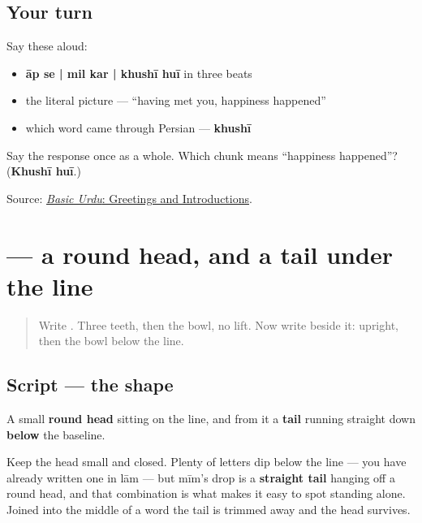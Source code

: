 \subsection*{Your turn}
Say these aloud:

\begin{itemize}
\raggedright
  \item \textbf{āp se | mil kar | khushī huī} in three beats
  \item the literal picture — “having met you, happiness happened”
  \item which word came through Persian — \textbf{khushī}
\end{itemize}

\begin{tcolorbox}[breakable,colback=teal!4,colframe=teal!35!black,title={Before you move on}]
Say the response once as a whole. Which chunk means “happiness happened”? (\textbf{Khushī huī}.)

Source: \href{https://openbooks.lib.msu.edu/urdu/chapter/2-2/}{\emph{Basic Urdu}: Greetings and Introductions}.
\end{tcolorbox}
\section[\texorpdfstring{\ur{م} (mīm)}{م (mīm)}]{ — a round head, and a tail under the line}

\label{lesson:UR-W03-mim}



\begin{quote}
Write . Three teeth, then the bowl, no lift. Now write  beside it: upright, then the bowl below the line.
\end{quote}

\subsection*{Script — the shape}

\begin{quote}
\end{quote}

A small \textbf{round head} sitting on the line, and from it a \textbf{tail} running straight down \textbf{below} the baseline.

Keep the head small and closed. Plenty of letters dip below the line — you have already written one in lām — but mīm's drop is a \textbf{straight tail} hanging off a round head, and that combination is what makes it easy to spot standing alone. Joined into the middle of a word the tail is trimmed away and the head survives.

